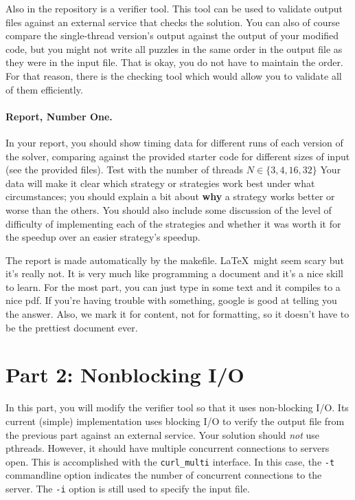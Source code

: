 \documentclass[letterpaper,10pt]{article}
\begin{document}
Also in the repository is a verifier tool. This tool can be used to validate
output files against an external service that checks the solution. You can
also of course compare the single-thread version's output against the output
of your modified code, but you might not write all puzzles in the same order
in the output file as they were in the input file. That is okay, you do not
have to maintain the order. For that reason, there is the checking tool
which would allow you to validate all of them efficiently.

\paragraph{Report, Number One.} In your report, you should show timing data 
for different runs of each version of the solver, comparing against the
provided starter code for different sizes of input (see the provided files).
Test with the number of threads $N \in \{3, 4, 16, 32\}$
Your data will make it clear which strategy or strategies work best under
what circumstances; you should explain a bit about \textbf{why} 
a strategy works
better or worse than the others. You should also include some discussion
of the level of difficulty of implementing each of the strategies and whether
it was worth it for the speedup over an easier strategy's speedup.

The report is made automatically by the makefile. \LaTeX~might seem scary
but it's really not. It is very much like programming a document and it's
a nice skill to learn. For the most part, you can just type in some text and
it compiles to a nice pdf. If you're having trouble with something, google
is good at telling you the answer. Also, we mark it for content, not for
formatting, so it doesn't have to be the prettiest document ever. 

\section*{Part 2: Nonblocking I/O}

In this part, you will modify the verifier tool so that it uses non-blocking
I/O. Its current (simple) implementation uses blocking I/O to verify the
output file from the previous part against an external service. 
Your solution should \emph{not} use pthreads. However, it should have multiple
concurrent connections to servers open. This is accomplished with the
\texttt{curl\_multi} interface.
In this case, the {\tt -t} commandline option indicates the number of 
concurrent connections to the server. The \texttt{-i} option is still used
to specify the input file.
\end{document}
